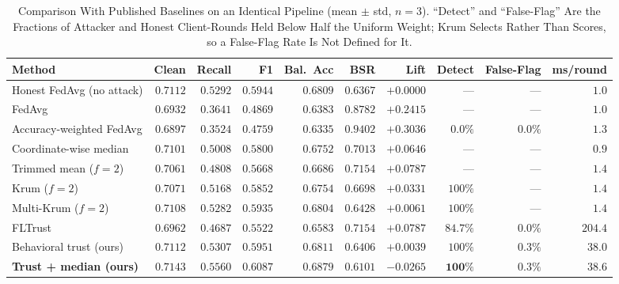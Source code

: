 \documentclass[journal]{IEEEtran}
\begin{document}
\begin{table}[!t]
\renewcommand{\arraystretch}{1.25}
\caption{Comparison With Published Baselines on an Identical Pipeline (mean $\pm$ std, $n=3$). ``Detect'' and ``False-Flag'' Are the Fractions of Attacker and Honest Client-Rounds Held Below Half the Uniform Weight; Krum Selects Rather Than Scores, so a False-Flag Rate Is Not Defined for It.}
\label{tab:benchmark}
\centering
\footnotesize
\setlength{\tabcolsep}{3.5pt}
\begin{tabular}{@{}l rrrr rr rr r@{}}
\toprule
\textbf{Method} & \textbf{Clean} & \textbf{Recall} & \textbf{F1} & \textbf{Bal.\ Acc} &
\textbf{BSR} & \textbf{Lift} & \textbf{Detect} & \textbf{False-Flag} & \textbf{ms/round} \\
\midrule
Honest FedAvg (no attack)      & $0.7112$ & $0.5292$ & $0.5944$ & $0.6809$ & $0.6367$ & $+0.0000$ & ---      & ---     & $1.0$   \\
\midrule
FedAvg                          & $0.6932$ & $0.3641$ & $0.4869$ & $0.6383$ & $0.8782$ & $+0.2415$ & ---      & ---     & $1.0$   \\
Accuracy-weighted FedAvg        & $0.6897$ & $0.3524$ & $0.4759$ & $0.6335$ & $0.9402$ & $+0.3036$ & $0.0\%$  & $0.0\%$ & $1.3$   \\
Coordinate-wise median          & $0.7101$ & $0.5008$ & $0.5800$ & $0.6752$ & $0.7013$ & $+0.0646$ & ---      & ---     & $0.9$   \\
Trimmed mean ($f{=}2$)          & $0.7061$ & $0.4808$ & $0.5668$ & $0.6686$ & $0.7154$ & $+0.0787$ & ---      & ---     & $1.4$   \\
Krum ($f{=}2$)                  & $0.7071$ & $0.5168$ & $0.5852$ & $0.6754$ & $0.6698$ & $+0.0331$ & $100\%$  & ---     & $1.4$   \\
Multi-Krum ($f{=}2$)            & $0.7108$ & $0.5282$ & $0.5935$ & $0.6804$ & $0.6428$ & $+0.0061$ & $100\%$  & ---     & $1.4$   \\
FLTrust \cite{cao2021fltrust}   & $0.6962$ & $0.4687$ & $0.5522$ & $0.6583$ & $0.7154$ & $+0.0787$ & $84.7\%$ & $0.0\%$ & $204.4$ \\
\midrule
Behavioral trust (ours)         & $0.7112$ & $0.5307$ & $0.5951$ & $0.6811$ & $0.6406$ & $+0.0039$ & $100\%$  & $0.3\%$ & $38.0$  \\
\textbf{Trust + median (ours)}  & $\mathbf{0.7143}$ & $\mathbf{0.5560}$ & $\mathbf{0.6087}$ & $\mathbf{0.6879}$ & $\mathbf{0.6101}$ & $\mathbf{-0.0265}$ & $\mathbf{100\%}$ & $0.3\%$ & $38.6$ \\
\bottomrule
\end{tabular}
\end{table}
\end{document}
